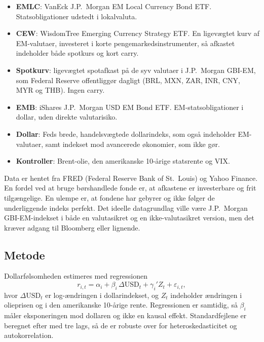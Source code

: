 \documentclass[11pt,a4paper]{article}
\begin{document}
\begin{itemize}\setlength\itemsep{0.1em}
  \item \textbf{EMLC}: VanEck J.P.\ Morgan EM Local Currency Bond ETF. Statsobligationer udstedt i lokalvaluta.
  \item \textbf{CEW}: WisdomTree Emerging Currency Strategy ETF. En ligevægtet kurv af EM-valutaer, investeret i korte pengemarkedsinstrumenter, så afkastet indeholder både spotkurs og kort carry.
  \item \textbf{Spotkurv}: ligevægtet spotafkast på de syv valutaer i J.P.\ Morgan GBI-EM, som Federal Reserve offentliggør dagligt (BRL, MXN, ZAR, INR, CNY, MYR og THB). Ingen carry.
  \item \textbf{EMB}: iShares J.P.\ Morgan USD EM Bond ETF. EM-statsobligationer i dollar, uden direkte valutarisiko.
  \item \textbf{Dollar}: Feds brede, handelsvægtede dollarindeks, som også indeholder EM-valutaer, samt indekset mod avancerede økonomier, som ikke gør.
  \item \textbf{Kontroller}: Brent-olie, den amerikanske 10-årige statsrente og VIX.
\end{itemize}

Data er hentet fra FRED (Federal Reserve Bank of St.\ Louis) og Yahoo Finance. En fordel ved at bruge børshandlede fonde er, at afkastene er investerbare og frit tilgængelige. En ulempe er, at fondene har gebyrer og ikke følger de underliggende indeks perfekt. Det ideelle datagrundlag ville være J.P.\ Morgan GBI-EM-indekset i både en valutasikret og en ikke-valutasikret version, men det kræver adgang til Bloomberg eller lignende.

\subsection{Metode}

Dollarfølsomheden estimeres med regressionen
\begin{equation}\label{eq:main}
r_{i,t} = \alpha_i + \beta_i\, \Delta \mathrm{USD}_t + \gamma_i' Z_t + \varepsilon_{i,t},
\end{equation}
hvor $\Delta \mathrm{USD}_t$ er log-ændringen i dollarindekset, og $Z_t$ indeholder ændringen i olieprisen og i den amerikanske 10-årige rente. Regressionen er samtidig, så $\beta_i$ måler eksponeringen mod dollaren og ikke en kausal effekt. Standardfejlene er beregnet efter \citet{newey1987} med tre lags, så de er robuste over for heteroskedasticitet og autokorrelation.
\end{document}
